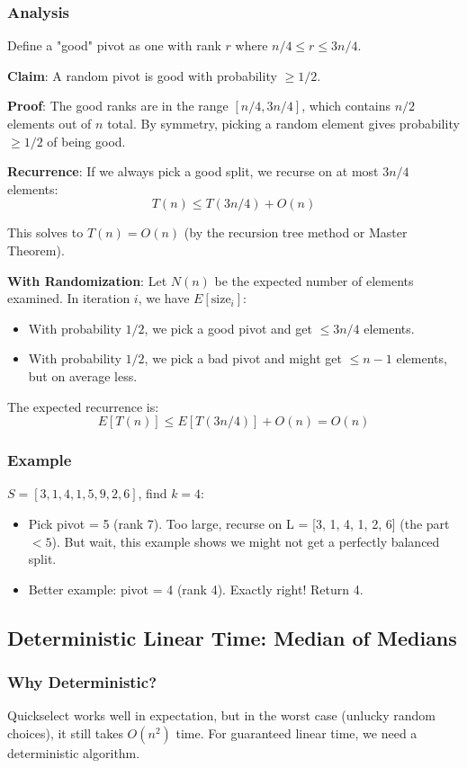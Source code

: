 \documentclass[11pt]{article}
\begin{document}
{{\subsubsection*{Analysis}
Define a "good" pivot as one with rank $r$ where $n/4 \le r \le 3n/4$. 

\textbf{Claim}: A random pivot is good with probability $\ge 1/2$.

\textbf{Proof}: The good ranks are in the range $[n/4, 3n/4]$, which contains $n/2$ elements out of $n$ total. By symmetry, picking a random element gives probability $\ge 1/2$ of being good.

\textbf{Recurrence}:
If we always pick a good split, we recurse on at most $3n/4$ elements:
\[
T(n) \le T(3n/4) + O(n)
\]

This solves to $T(n) = O(n)$ (by the recursion tree method or Master Theorem).

\textbf{With Randomization}:
Let $N(n)$ be the expected number of elements examined. In iteration $i$, we have $E[\text{size}_i]$:
\begin{itemize}
\item With probability $1/2$, we pick a good pivot and get $\le 3n/4$ elements.
\item With probability $1/2$, we pick a bad pivot and might get $\le n-1$ elements, but on average less.
\end{itemize}

The expected recurrence is:
\[
E[T(n)] \le E[T(3n/4)] + O(n) = O(n)
\]

\subsubsection*{Example}
$S = [3, 1, 4, 1, 5, 9, 2, 6]$, find $k=4$:
\begin{itemize}
\item Pick pivot = 5 (rank 7). Too large, recurse on L = [3, 1, 4, 1, 2, 6] (the part $< 5$). But wait, this example shows we might not get a perfectly balanced split.
\item Better example: pivot = 4 (rank 4). Exactly right! Return 4.
\end{itemize}

\subsection*{Deterministic Linear Time: Median of Medians}

\subsubsection*{Why Deterministic?}
Quickselect works well in expectation, but in the worst case (unlucky random choices), it still takes $O(n^2)$ time. For guaranteed linear time, we need a deterministic algorithm.

}}
\end{document}
